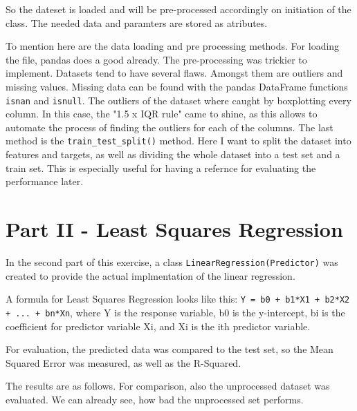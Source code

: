 \documentclass{CPSReport}
\begin{document}
So the dateset is loaded and will be pre-processed accordingly on initiation of the class. The needed data and paramters are stored as atributes.

To mention here are the data loading and pre processing methods. For loading the file, pandas does a good already. The pre-processing was trickier to implement. Datasets tend to have several flaws. Amongst them are outliers and missing values.
Missing data can be found with the pandas DataFrame functions \texttt{isnan} and \texttt{isnull}.
The outliers of the dataset where caught by boxplotting every column. In this case, the "1.5 x IQR rule" came to shine, as this allows to automate the process of finding the outliers for each of the columns.
The last method is the \texttt{train_test_split()} method. Here I want to split the dataset into features and targets, as well as dividing the whole dataset into a test set and a train set. This is especially useful for having a refernce for evaluating the performance later.

\section{Part II - Least Squares Regression}
In the second part of this exercise, a class \texttt{LinearRegression(Predictor)} was created to provide the actual implmentation of the linear regression.

A formula for Least Squares Regression looks like this:
\texttt{Y = b0 + b1*X1 + b2*X2 + ... + bn*Xn}, where Y is the response variable, b0 is the y-intercept, bi is the coefficient for predictor variable Xi, and Xi is the ith predictor variable.

For evaluation, the predicted data was compared to the test set, so the Mean Squared Error was measured, as well as the R-Squared.

The results are as follows. For comparison, also the unprocessed dataset was evaluated. We can already see, how bad the unprocessed set performs.
\end{document}
